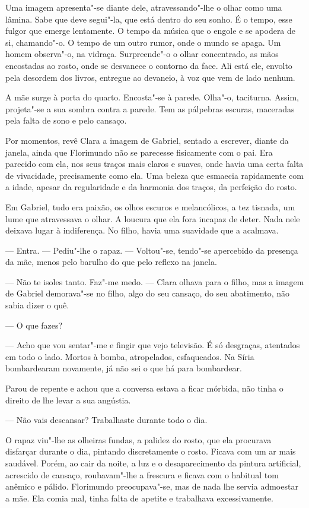 Uma imagem apresenta"-se diante dele, atravessando"-lhe o olhar como uma
lâmina. Sabe que deve segui"-la, que está dentro do seu sonho. É o tempo,
esse fulgor que emerge lentamente. O tempo da música que o engole e se
apodera de si, chamando"-o. O tempo de um outro rumor, onde o mundo se
apaga. Um homem observa"-o, na vidraça. Surpreende"-o o olhar concentrado,
as mãos encostadas ao rosto, onde se desvanece o contorno da face. Ali
está ele, envolto pela desordem dos livros, entregue ao devaneio, à voz
que vem de lado nenhum.

A mãe surge à porta do quarto. Encosta"-se à parede. Olha"-o, taciturna.
Assim, projeta"-se a sua sombra contra a parede. Tem as pálpebras
escuras, maceradas pela falta de sono e pelo cansaço.

Por momentos, revê Clara a imagem de Gabriel, sentado a escrever, diante
da janela, ainda que Florimundo não se parecesse fisicamente com o pai.
Era parecido com ela, nos seus traços mais claros e suaves, onde havia
uma certa falta de vivacidade, precisamente como ela. Uma beleza que
esmaecia rapidamente com a idade, apesar da regularidade e da harmonia
dos traços, da perfeição do rosto.

Em Gabriel, tudo era paixão, os olhos escuros e melancólicos, a tez
tisnada, um lume que atravessava o olhar. A loucura que ela fora incapaz
de deter. Nada nele deixava lugar à indiferença. No filho, havia uma
suavidade que a acalmava.

--- Entra. --- Pediu"-lhe o rapaz. --- Voltou"-se, tendo"-se apercebido da
presença da mãe, menos pelo barulho do que pelo reflexo na janela.

--- Não te isoles tanto. Faz"-me medo. --- Clara olhava para o filho, mas a
imagem de Gabriel demorava"-se no filho, algo do seu cansaço, do seu
abatimento, não sabia dizer o quê.

--- O que fazes?

--- Acho que vou sentar"-me e fingir que vejo televisão. É só desgraças,
atentados em todo o lado. Mortos à bomba, atropelados, esfaqueados. Na
Síria bombardearam novamente, já não sei o que há para bombardear.

Parou de repente e achou que a conversa estava a ficar mórbida, não
tinha o direito de lhe levar a sua angústia.

--- Não vais descansar? Trabalhaste durante todo o dia.

O rapaz viu"-lhe as olheiras fundas, a palidez do rosto, que ela
procurava disfarçar durante o dia, pintando discretamente o rosto.
Ficava com um ar mais saudável. Porém, ao cair da noite, a luz e o
desaparecimento da pintura artificial, acrescido de cansaço,
roubavam"-lhe a frescura e ficava com o habitual tom anêmico e pálido.
Florimundo preocupava"-se, mas de nada lhe servia admoestar a mãe. Ela
comia mal, tinha falta de apetite e trabalhava excessivamente.

